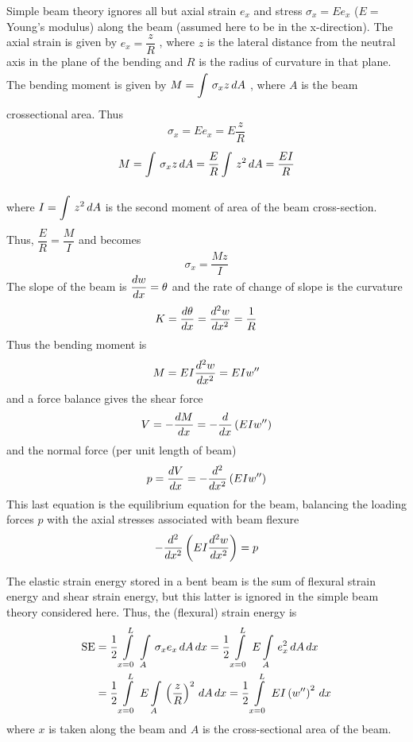 Simple beam theory ignores all but axial strain $e_{x}$  and stress 
$\sigma_{x}=Ee_{x}$  ($E=$ Young's modulus) along the beam (assumed here to be 
in the x-direction). The axial strain is given by $e_{x} = \dfrac{z}{R}$ ,
where $z$ is the lateral distance from the neutral axis in the plane of the 
bending and $R$ is the radius of curvature in that plane. The bending moment 
is given by $M=   \displaystyle\int\limits_{}^{} \,\sigma_{x} z\,dA $ , where $A$ is the beam crossectional 
area. Thus 
\begin{equation}
  \sigma_{x} =  Ee_{x} = E\dfrac{z}{R}
  \label{eqn:bem1}
\end{equation}
\begin{equation}
  M  =   \displaystyle\int\limits_{}^{} \,\sigma_{x} z\,dA  = \frac{E}{R}   \displaystyle\int\limits_{}^{} \,z^{2}\,dA  
     = \dfrac{EI}{R}
  \label{eqn:bem2}
\end{equation}
where $I =   \displaystyle\int\limits_{}^{} \,z^{2}\,dA $ is the second moment of area of the beam
cross-section. Thus, $\dfrac{E}{R} = \dfrac{M}{I}$ and  becomes
\begin{equation}
  \sigma_{x} = \dfrac{Mz}{I}
  \label{eqn:bem3}
\end{equation}
The slope of the beam is  $ \dfrac{ d w}{d x}  = \theta$  and the rate of change of 
slope is the curvature 
\begin{equation}
  K= \dfrac{ d \theta}{d x}  =  \dfrac{ d^{2} w}{d {x}^{2}}  = \dfrac{1}{R}
  \label{eqn:slope}
\end{equation}
Thus the bending moment is 
\begin{equation}
  M=EI  \dfrac{ d^{2} w}{d {x}^{2}}  = EIw''
  \label{eqn:bmom}
\end{equation}
and a force balance gives the shear force
\begin{equation}
  V=- \dfrac{ d M}{d x}  = -  \dfrac{ d  }{d x} \left( EIw'' \right)
  \label{eqn:shf}
\end{equation}
and the normal force (per unit length of beam)
\begin{equation}
  p= \dfrac{ d V}{d x}  = - \dfrac{ d^{2}  }{d {x}^{2}} \left( EIw'' \right)
  \label{eqn:normf}
\end{equation}
This last equation is the equilibrium equation for the beam, balancing the 
loading forces $p$ with the axial stresses associated with beam flexure
\begin{equation}
  - \dfrac{ d^{2}  }{d {x}^{2}}  \left( EI  \dfrac{ d^{2} w}{d {x}^{2}}  \right) = p
  \label{eqn:lasteq}
\end{equation}

The elastic strain energy stored in a bent beam is the sum of flexural strain
energy and shear strain energy, but this latter is ignored in the simple beam
theory considered here. Thus, the (flexural) strain energy is
\begin{align*}
  \text{SE} &= \dfrac{1}{2}   \displaystyle\int\limits_{x=0}^{L} \,   \displaystyle\int\limits_{A}^{} \,\sigma_{x}e_{x}\,dA  \,dx  =  
  \dfrac{1}{2}   \displaystyle\int\limits_{x=0}^{L} \,E   \displaystyle\int\limits_{A}^{} \,e_{x}^{2}\,dA  \,dx  \\
  &= \dfrac{1}{2}   \displaystyle\int\limits_{x=0}^{L} \,E    \displaystyle\int\limits_{A}^{} \,\left( \dfrac{z}{R} 
   \right)^{2}\,dA  \,dx  =  \dfrac{1}{2}   \displaystyle\int\limits_{x=0}^{L} \,EI\left( w'' \right)^{2}\,dx 
\end{align*}    
where $x$ is taken along the beam and $A$ is the cross-sectional area of the 
beam.

